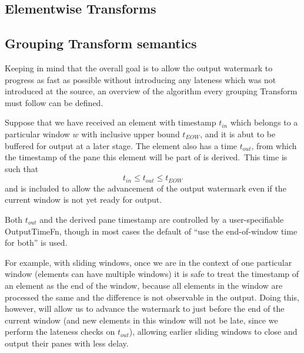 \subsection{Elementwise Transforms}\label{sec:impl:dataflow:elementwise}


\subsection{Grouping Transform semantics}\label{sec:impl:dataflow:grouping}


Keeping in mind that the overall goal is to allow the output watermark to progress as fast as possible without introducing any lateness which was not introduced at the source, an overview of the algorithm every grouping Transform must follow can be defined.

Suppose that we have received an element with timestamp $t_{\mathit{in}}$ which belongs to a particular window $w$ with inclusive upper bound $t_{\mathit{EOW}}$, and it is abut to be buffered for output at a later stage.
The element also has a time $t_{\mathit{out}}$, from which the timestamp of the pane this element will be part of is derived.\footnotemark\ 
This time is such that \[t_{\mathit{in}} \leq t_{\mathit{out}} \leq t_{\mathit{EOW}}\] and is included to allow the advancement of the output watermark even if the current window is not yet ready for output.

\footnotetext
{
Both $t_{\mathit{out}}$ and the derived pane timestamp are controlled by a user-specifiable OutputTimeFn, though in most cases the default of ``use the end-of-window time for both'' is used.
}

For example, with sliding windows, once we are in the context of one particular window (elements can have multiple windows) it is safe to treat the timestamp of an element as the end of the window, because all elements in the window are processed the same and the difference is not observable in the output.
Doing this, however, will allow us to advance the watermark to just before the end of the current window (and new elements in this window will not be late, since we perform the lateness checks on $t_{\mathit{out}}$), allowing earlier sliding windows to close and output their panes with less delay.



